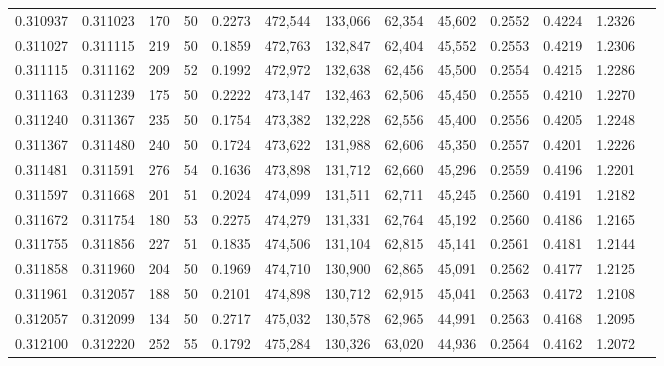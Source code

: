 \begin{tabular}{rrrrrrrrrrrrr}
0.310937 & 0.311023 &   170 &  50 &                                     0.2273 & 472,544 & 133,066 &  62,354 &  45,602 & 0.2552 & 0.4224 & 1.2326 \\
0.311027 & 0.311115 &   219 &  50 &                                     0.1859 & 472,763 & 132,847 &  62,404 &  45,552 & 0.2553 & 0.4219 & 1.2306 \\
0.311115 & 0.311162 &   209 &  52 &                                     0.1992 & 472,972 & 132,638 &  62,456 &  45,500 & 0.2554 & 0.4215 & 1.2286 \\
0.311163 & 0.311239 &   175 &  50 &                                     0.2222 & 473,147 & 132,463 &  62,506 &  45,450 & 0.2555 & 0.4210 & 1.2270 \\
0.311240 & 0.311367 &   235 &  50 &                                     0.1754 & 473,382 & 132,228 &  62,556 &  45,400 & 0.2556 & 0.4205 & 1.2248 \\
0.311367 & 0.311480 &   240 &  50 &                                     0.1724 & 473,622 & 131,988 &  62,606 &  45,350 & 0.2557 & 0.4201 & 1.2226 \\
0.311481 & 0.311591 &   276 &  54 &                                     0.1636 & 473,898 & 131,712 &  62,660 &  45,296 & 0.2559 & 0.4196 & 1.2201 \\
0.311597 & 0.311668 &   201 &  51 &                                     0.2024 & 474,099 & 131,511 &  62,711 &  45,245 & 0.2560 & 0.4191 & 1.2182 \\
0.311672 & 0.311754 &   180 &  53 &                                     0.2275 & 474,279 & 131,331 &  62,764 &  45,192 & 0.2560 & 0.4186 & 1.2165 \\
0.311755 & 0.311856 &   227 &  51 &                                     0.1835 & 474,506 & 131,104 &  62,815 &  45,141 & 0.2561 & 0.4181 & 1.2144 \\
0.311858 & 0.311960 &   204 &  50 &                                     0.1969 & 474,710 & 130,900 &  62,865 &  45,091 & 0.2562 & 0.4177 & 1.2125 \\
0.311961 & 0.312057 &   188 &  50 &                                     0.2101 & 474,898 & 130,712 &  62,915 &  45,041 & 0.2563 & 0.4172 & 1.2108 \\
0.312057 & 0.312099 &   134 &  50 &                                     0.2717 & 475,032 & 130,578 &  62,965 &  44,991 & 0.2563 & 0.4168 & 1.2095 \\
0.312100 & 0.312220 &   252 &  55 &                                     0.1792 & 475,284 & 130,326 &  63,020 &  44,936 & 0.2564 & 0.4162 & 1.2072 \\

\end{tabular}
